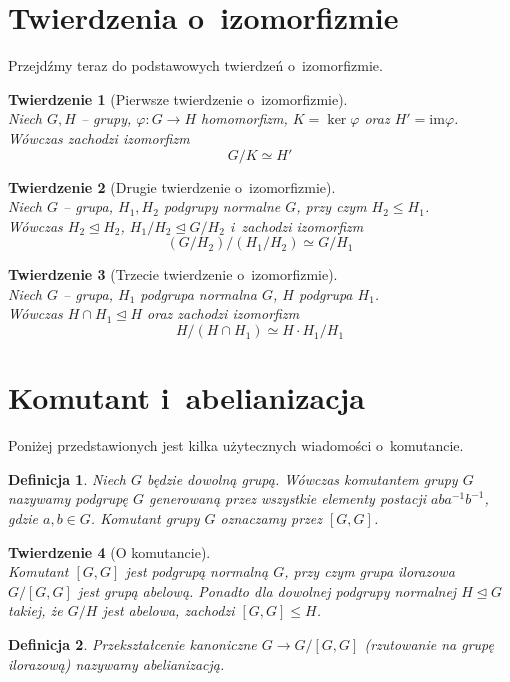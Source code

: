 \documentclass[licencjacka]{pracamgr}
\newtheorem{deff}{Definicja}[section]
\newtheorem{thh}{Twierdzenie}[section]
\begin{document}
\section{Twierdzenia o~izomorfizmie}
Przejdźmy teraz do podstawowych twierdzeń o~izomorfizmie.
\begin{thh}[Pierwsze twierdzenie o~izomorfizmie] $ $ \\
	Niech $G, H$ -- grupy, 	$ \varphi \colon G \to H$ homomorfizm, $K = \ker{\varphi}$ oraz $H' = \mathrm{im}\varphi $. \\
	Wówczas zachodzi izomorfizm $$G/K \simeq H'$$
\end{thh}
\begin{thh}[Drugie twierdzenie o~izomorfizmie]$ $\\
	Niech $G$ -- grupa, 	$H_1, H_2$ podgrupy normalne $G$, przy czym $H_2 \leq H_1$. \\
	Wówczas $H_2 \trianglelefteq H_2$, $H_1/H_2 \trianglelefteq G/H_2$ i~zachodzi izomorfizm
	$$ (G/H_2) / (H_1/H_2) \simeq G/H_1$$
\end{thh}
\begin{thh}[Trzecie twierdzenie o~izomorfizmie] $ $ \\
	Niech $G$ -- grupa, $H_1$ podgrupa normalna $G$, $H$ podgrupa $H_1$. \\
	Wówczas $H\cap H_1 \trianglelefteq H$ oraz zachodzi izomorfizm
	$$ H/(H\cap H_1) \simeq H \cdot H_1 / H_1 $$
\end{thh}


\section{Komutant i~abelianizacja}
Poniżej przedstawionych jest kilka użytecznych wiadomości o~komutancie.
\begin{deff}
	Niech $G$ będzie dowolną grupą. Wówczas \emph{komutantem grupy $G$} nazywamy podgrupę $G$ generowaną przez wszystkie elementy postacji
	$aba^{-1}b^{-1}$, gdzie $a, b \in G$. Komutant grupy $G$ oznaczamy przez $[G, G]$.
\end{deff}
\begin{thh}[O komutancie] $ $\\
	Komutant $[G,G]$ jest podgrupą normalną $G$, przy czym grupa ilorazowa $G/[G,G]$ jest grupą abelową.
	Ponadto dla dowolnej podgrupy normalnej $H \trianglelefteq G$ takiej, że $G/H$ jest abelowa, zachodzi $[G,G] \le H$.
\end{thh}
\begin{deff}
	Przekształcenie kanoniczne $G \to G/[G,G]$ (rzutowanie na grupę ilorazową) nazywamy abelianizacją.
\end{deff}
\end{document}
